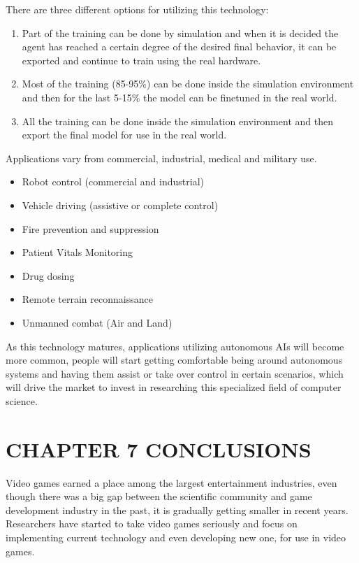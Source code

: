 \documentclass[a4paper,one side,12pt]{book}
\begin{document}
There are three different options for utilizing this technology:

\begin{enumerate}
\def\labelenumi{\arabic{enumi}.}
\item
  Part of the training can be done by simulation and when it is decided
  the agent has reached a certain degree of the desired final behavior,
  it can be exported and continue to train using the real hardware.
\item
  Most of the training (85-95\%) can be done inside the simulation
  environment and then for the last 5-15\% the model can be finetuned in
  the real world.
\item
  All the training can be done inside the simulation environment and
  then export the final model for use in the real world.
\end{enumerate}

Applications vary from commercial, industrial, medical and military use.

\begin{itemize}
\item
  Robot control (commercial and industrial)
\item
  Vehicle driving (assistive or complete control)
\item
  Fire prevention and suppression
\item 
  Patient Vitals Monitoring
\item 
  Drug dosing
\item
  Remote terrain reconnaissance
\item
  Unmanned combat (Air and Land)
\end{itemize}

As this technology matures, applications utilizing autonomous AIs will
become more common, people will start getting comfortable being around
autonomous systems and having them assist or take over control in
certain scenarios, which will drive the market to invest in researching
this specialized field of computer science.

\pagebreak

\chapter{CHAPTER 7 CONCLUSIONS}

Video games earned a place among the largest entertainment industries,
even though there was a big gap between the scientific community and
game development industry in the past, it is gradually getting smaller
in recent years. Researchers have started to take video games seriously
and focus on implementing current technology and even developing new
one, for use in video games.
\end{document}
